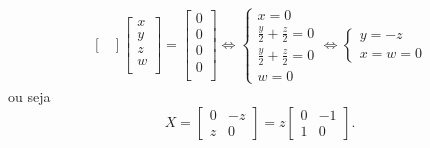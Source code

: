 \documentclass[12pt,a4paper]{article}
\begin{document}
\begin{ExerciseList}
\begin{enumerate}
\begin{align*}
\begin{bmatrix}
\end{bmatrix}
\begin{bmatrix}
x \\
y \\
z \\
w \\
\end{bmatrix}
=
\begin{bmatrix}
0 \\
0 \\
0 \\
0 \\
\end{bmatrix}
\Leftrightarrow
\begin{cases}
x=0\\
\frac{y}{2}+\frac{z}{2} = 0\\
\frac{y}{2}+\frac{z}{2} = 0\\
w=0
\end{cases}
\Leftrightarrow
\begin{cases}
y=-z\\
x=w=0
\end{cases}
\end{align*}
ou seja
\[
X =
\begin{bmatrix}
0 & -z \\
z & 0
\end{bmatrix}
=
z
\begin{bmatrix}
0 & -1 \\
1 & 0
\end{bmatrix}
.
\]


\end{enumerate}
\end{ExerciseList}
\end{document}

